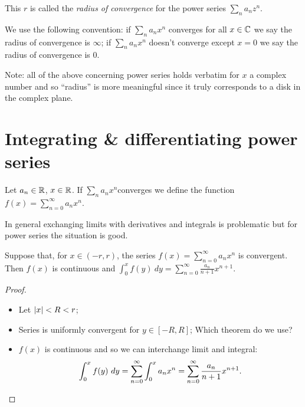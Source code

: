 \begin{definition}
  This \(r\) is called the \emph{radius of convergence} for the power series \(\sum_n a_n z^n\).
\end{definition}

We use the following convention:
if \(\sum_n a_n x^n\) converges for all \(x\in \mathbb{C}\) we say the radius of convergence is \(\infty\);
if \(\sum_n a_n x^n\) doesn't converge except  \(x=0\) we say the radius of convergence is \(0\).

Note: all of the above concerning power series holds verbatim for \(x\) a complex number and so ``radius'' is more meaningful since it truly corresponds to a disk in the complex plane.




\section{Integrating \& differentiating power series}



Let \(a_n \in \mathbb{R}\), \(x\in \mathbb{R}\).
If \(\sum_n a_n x^n\)converges we define the function \(f(x) = \sum_{n=0}^{\infty} a_n x^n\).

In general exchanging limits with derivatives and integrals is problematic but for power series the situation is good.



\begin{theorem}%
  \label{thm:integrate-power}
  Suppose that, for \(x\in (-r,r)\), the series  \(f(x) = \sum_{n=0}^{\infty} a_n x^n\) is convergent.
  Then \(f(x)\) is continuous and \(\int_0^x f(y) \ dy = \sum_{n=0}^{\infty} \frac{a_n}{n+1} x^{n+1}\).
\end{theorem}

\begin{proof}
  \begin{itemize}
    \item Let \(\left|x\right|<R<r\);
    \item Series is uniformly convergent for \(y\in[-R,R]\);
          {Which theorem do we use?}
    \item \(f(x)\) is continuous and so we can interchange limit and integral: %
          \[
            \int_0^x f(y) \ dy
            = \sum_{n=0}^{\infty} \int_0^x  {a_n} x^{n}
            = \sum_{n=0}^{\infty} \frac{a_n}{n+1} x^{n+1}. \qedhere
          \]
  \end{itemize}
\end{proof}


